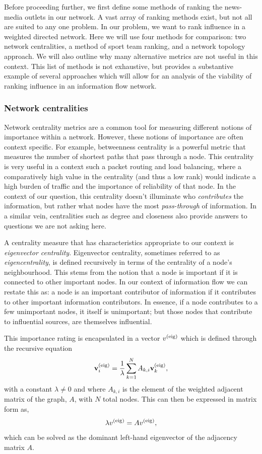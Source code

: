 Before proceeding further, we first define some methods of ranking the news-media outlets in our network. A vast array of ranking methods exist, but not all are suited to any one problem. In our problem, we want to rank influence in a weighted directed network. Here we will use four methods for comparison: two network centralities, a method of sport team ranking, and a network topology approach. We will also outline why many alternative metrics are not useful in this context. This list of methods is not exhaustive, but provides a substantive example of several approaches which will allow for an analysis of the viability of ranking influence in an information flow network. 

\subsubsection{Network centralities}

Network centrality metrics are a common tool for measuring different notions of importance within a network. However, these notions of importance are often context specific. For example, betweenness centrality is a powerful metric that measures the number of shortest paths that pass through a node. This centrality is very useful in a context such a packet routing and load balancing, where a comparatively high value in the centrality (and thus a low rank) would indicate a high burden of traffic and the importance of reliability of that node. In the context of our question, this centrality doesn't illuminate who \emph{contributes} the information, but rather what nodes have the most \emph{pass-through} of information. In a similar vein, centralities such as degree and closeness also provide answers to questions we are not asking here.

A centrality measure that has characteristics appropriate to our context is \emph{eigenvector centrality}. Eigenvector centrality, sometimes referred to as \emph{eigencentrality}, is defined recursively in terms of the centrality of a node's neighbourhood. This stems from the notion that a node is important if it is connected to other important nodes. In our context of information flow we can restate this as: a node is an important contributor of information if it contributes to other important information contributors. In essence, if a node contributes to a few unimportant nodes, it itself is unimportant; but those nodes that contribute to influential sources, are themselves influential.

This importance rating is encapsulated in a vector $v^{\rm(eig)}$ which is defined through the recursive equation
\begin{equation}\label{eq:eigenvector}
\textbf{v}_{i}^{\rm(eig)}=\frac{1}{\lambda} \sum_{k=1}^{N} A_{k, i} \textbf{v}_{k}^{\rm(eig)},
\end{equation}
with a constant $\lambda \neq 0$ and where $A_{k, i}$ is the element of the weighted adjacent matrix of the graph, $A$, with $N$ total nodes. This can then be expressed in matrix form as,
\begin{equation}
\lambda v^{\rm(eig)} = A v^{\rm(eig)}, 
\end{equation}
which can be solved as the dominant left-hand eigenvector of the adjacency matrix $A$. 

